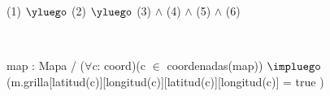 \begin{Representacion}
$ $\newline

%
{{(1) $\yluego$ (2) $\yluego$ (3) $\land$ (4) $\land$ (5) $\land$ (6)}} 

$ $\newline
$ $\newline



%
{map : Mapa / ($\forall c$: coord)(c $\in$ coordenadas(map)) $\impluego$ \\
(m.grilla[latitud(c)][longitud(c)][latitud(c)][longitud(c)] = true )}%

\end{Representacion}

$ $\newline
$ $\newline

